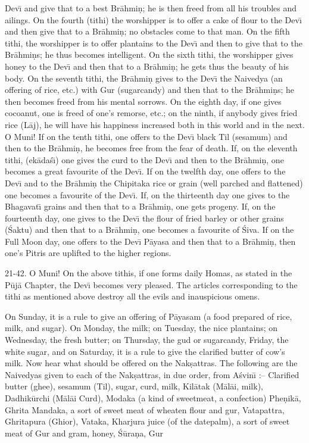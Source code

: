 Dev\={\i} and give that to a best Br\=ahmi\d{n}; he is then freed from all his troubles and ailings. On the fourth (tithi) the worshipper is to offer a cake of flour to the Dev\={\i} and then give that to a Br\=ahmi\d{n}; no obstacles come to that man. On the fifth tithi, the worshipper is to offer plantains to the Dev\={\i} and then to give that to the Br\=ahmi\d{n}s; he thus becomes intelligent. On the sixth tithi, the worshipper gives honey to the Dev\={\i} and then that to a Br\=ahmi\d{n}; he gets thus the beauty of his body. On the seventh tithi, the Br\=ahmi\d{n} gives to the Dev\={\i} the Naivedya (an offering of rice, etc.) with Gur (sugarcandy) and then that to the Br\=ahmi\d{n}s; he then becomes freed from his mental sorrows. On the eighth day, if one gives cocoanut, one is freed of one's remorse, etc.; on the ninth, if anybody gives fried rice (L\=aj), he will have his happiness increased both in this world and in the next. O Muni! If on the tenth tithi, one offers to the Dev\={\i} black Til (sesamum) and then to the Br\=ahmi\d{n}, he becomes free from the fear of death. If, on the eleventh tithi, (ek\=ada\'s\={\i}) one gives the curd to the Dev\={\i} and then to the Br\=ahmi\d{n}, one becomes a great favourite of the Dev\={\i}. If on the twelfth day, one offers to the Dev\={\i} and to the Br\=ahmi\d{n} the Chipitaka rice or grain (well parched and flattened) one becomes a favourite of the Dev\={\i}. If, on the thirteenth day one gives to the Bhagavat\={\i} grains and then that to a Br\=ahmi\d{n}, one gets progeny. If, on the fourteenth day, one gives to the Dev\={\i} the flour of fried barley or other grains (\'Saktu) and then that to a Br\=ahmi\d{n}, one becomes a favourite of \'Siva. If on the Full Moon day, one offers to the Dev\={\i} P\=ayasa and then that to a Br\=ahmi\d{n}, then one's Pitris are uplifted to the higher regions.

21-42. O Muni! On the above tithis, if one forms daily Homas, as stated in the P\=uj\=a Chapter, the Dev\={\i} becomes very pleased. The articles corresponding to the tithi as mentioned above destroy all the evils and inauspicious omens.

On Sunday, it is a rule to give an offering of P\=ayasam (a food prepared of rice, milk, and sugar). On Monday, the milk; on Tuesday, the nice plantains; on Wednesday, the fresh butter; on Thursday, the gud or sugarcandy, Friday, the white sugar, and on Saturday, it is a rule to give the clarified butter of cow's milk. Now hear what should be offered on the Nak\d{s}attras. The following are the Naivedyas given to each of the Nak\d{s}attras, in due order, from A\'svin\={\i} :-- Clarified butter (ghee), sesamum (Til), sugar, curd, milk, Kil\=atak (M\=al\=ai, milk), Dadhik\=urchi (M\=al\=ai Curd), Modaka (a kind of sweetmeat, a confection) Phe\d{n}ik\=a, Ghrita Mandaka, a sort of sweet meat of wheaten flour and gur, Vatapattra, Ghritapura (Ghior), Vataka, Kharjura juice (of the datepalm), a sort of sweet meat of Gur and gram, honey, \'S\=ura\d{n}a, Gur

